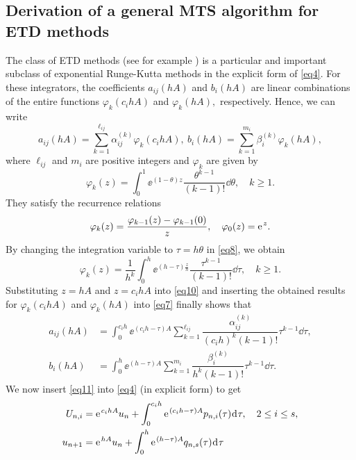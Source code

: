\subsection{Derivation of a general MTS algorithm for ETD methods}
\label{sec3.2}
The class of ETD methods (see for example \cite{CM02,F78}) is a particular and important subclass of exponential Runge-Kutta methods in the explicit form of \eqref{eq4}. For these integrators, the coefficients $a_{ij}(h A)$ and $b_{i}(h A) $ are linear combinations of the entire functions $\varphi _{k} (c_i h A)$ and $\varphi_{k} (hA),$ respectively. 
Hence, we can write
\begin{equation} \label{eq7}
a_{ij}(h A)=\sum_{k=1}^{\ell_{ij}}\alpha^{(k)}_{ij}\varphi_{k}(c_i hA), \ 
b_{i}(h A)=\sum_{k=1}^{m_i}\beta^{(k)}_{i}\varphi_{k}(hA), 
\end{equation} 
where $\ell_{ij}$ and $m_i$ are positive integers and $\varphi_k$ are given by 
\begin{equation} \label{eq8}
\varphi _{k}(z)=\int_{0}^{1} \ee^{(1-\theta )z} \frac{\theta ^{k-1}}{(k-1)!}\dd\theta , \quad k\geq 1.
\end{equation}
They satisfy the recurrence relations
\begin{equation} \label{eq9}
 \varphi _{k}(z)=\frac{\varphi _{k-1}(z)-\varphi _{k-1}(0)}{z}, \q  \varphi _{0}(z)=\ee^z.
\end{equation} 
By changing the integration variable to $\tau=h\theta$ in \eqref{eq8}, we obtain
\begin{equation} \label{eq10}
\varphi _{k}(z)=\frac{1}{h^k}\int_{0}^{h} \ee^{(h-\tau)\frac{z}{h}} \frac{\tau^{k-1}}{(k-1)!}\dd\tau , \quad k\geq 1.
\end{equation}
Substituting $z=hA$ and $z=c_i hA$ into \eqref{eq10} and inserting the obtained results for $\varphi _{k} (c_i h A)$ and $\varphi_{k} (hA)$ into \eqref{eq7} finally shows that
\begin{subequations}\label{eq11}
\begin{align}
a_{ij}(h A)&=\int_{0}^{c_i h} \ee^{(c_i h-\tau)A} \sum_{k=1}^{\ell_{ij}}\dfrac{\alpha^{(k)}_{ij}}{(c_i h)^{k} (k-1)!}\tau^{k-1}\dd\tau, \label{eq11a}\\ 
b_{i}(h A)&=\int_{0}^{h} \ee^{(h-\tau)A} \sum_{k=1}^{m_i}\dfrac{\beta^{(k)}_{i}}{h^{k}(k-1)!}\tau^{k-1}\dd\tau. \label{eq11b}
\end{align}
\end{subequations}
We now insert \eqref{eq11} into \eqref{eq4} (in explicit form) to get
\begin{subequations} \label{eq12}
\begin{align}
 U_{n,i}&= \ee^{c_i h A}u_n +\int_{0}^{c_i h} \ee^{(c_i h-\tau)A}   p_{n,i}(\tau) \dd\tau, \q  2\leq i\leq s,  \label{eq12a} \\
u_{n+1} &= \ee^{h A}u_n +  \int_{0}^{h} \ee^{(h-\tau)A}  q_{n,s}(\tau) \dd\tau  \label{eq12b} 
\end{align} 
\end{subequations}

